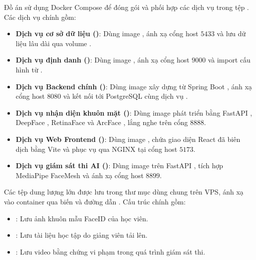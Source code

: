 \documentclass[../DoAn.tex]{subfiles}
\begin{document}
Đồ án sử dụng Docker Compose \cite{docker_compose_docs2026} để đóng gói và phối hợp các dịch vụ trong tệp . Các dịch vụ chính gồm:
\begin{itemize}
    \item \textbf{Dịch vụ cơ sở dữ liệu ()}: Dùng image  \cite{postgresql_docs2026}, ánh xạ cổng host $5433$ và lưu dữ liệu lâu dài qua volume .
    \item \textbf{Dịch vụ định danh ()}: Dùng image  \cite{keycloak2026}, ánh xạ cổng host $9000$ và import cấu hình từ .
    \item \textbf{Dịch vụ Backend chính ()}: Dùng image  xây dựng từ Spring Boot \cite{spring_boot_docs2026}, ánh xạ cổng host $8080$ và kết nối tới PostgreSQL cùng dịch vụ .
    \item \textbf{Dịch vụ nhận diện khuôn mặt ()}: Dùng image  phát triển bằng FastAPI \cite{fastapi_docs2026}, DeepFace \cite{deepface_github}, RetinaFace \cite{Deng_2020_CVPR} và ArcFace \cite{Deng_2019_CVPR}, lắng nghe trên cổng $8888$.
    \item \textbf{Dịch vụ Web Frontend ()}: Dùng image , chứa giao diện React \cite{react_docs2026} đã biên dịch bằng Vite \cite{vite_docs2026} và phục vụ qua NGINX tại cổng host $5173$.
    \item \textbf{Dịch vụ giám sát thi AI ()}: Dùng image  trên FastAPI \cite{fastapi_docs2026}, tích hợp MediaPipe FaceMesh \cite{Lugaresi2019MediaPipe} và ánh xạ cổng host $8899$.
\end{itemize}

Các tệp dung lượng lớn được lưu trong thư mục dùng chung trên VPS, ánh xạ vào container qua biến  và đường dẫn . Cấu trúc chính gồm:
\begin{itemize}
    \item {}: Lưu ảnh khuôn mẫu FaceID của học viên.
    \item {}: Lưu tài liệu học tập do giảng viên tải lên.
    \item {}: Lưu video bằng chứng vi phạm trong quá trình giám sát thi.
\end{itemize}
\end{document}
